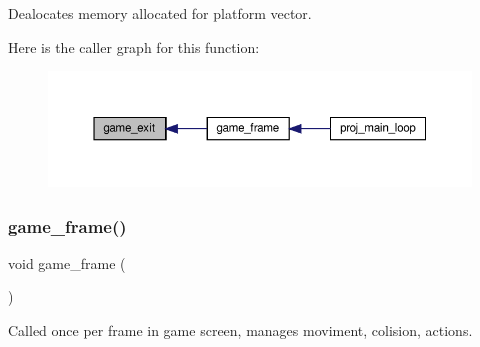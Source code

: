 Dealocates memory allocated for platform vector. 

Here is the caller graph for this function\+:\nopagebreak
\begin{figure}[H]
\begin{center}
\leavevmode
\includegraphics[width=350pt]{group__Game_gad082b8fe4e94ee090f0c6c9d11b4d565_icgraph}
\end{center}
\end{figure}
\mbox{\label{group__Game_gad1af7212c4703893c625ad5a5e9107e0}} 
\subsubsection{\texorpdfstring{game\+\_\+frame()}{game\_frame()}}
{\footnotesize\ttfamily void game\+\_\+frame (\begin{DoxyParamCaption}{ }\end{DoxyParamCaption})}



Called once per frame in game screen, manages moviment, colision, actions. 

